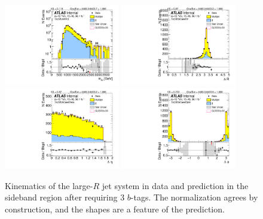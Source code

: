 \begin{figure}[htbp!]
\begin{center}
\includegraphics[angle=270, width=0.45\textwidth]{./figures/boosted/Sideband/b77_ThreeTag_Sideband_mHH_l_1.pdf}
\includegraphics[angle=270, width=0.45\textwidth]{./figures/boosted/Sideband/b77_ThreeTag_Sideband_hCandDr.pdf}\\
\includegraphics[angle=270, width=0.45\textwidth]{./figures/boosted/Sideband/b77_ThreeTag_Sideband_hCandDeta.pdf}
\includegraphics[angle=270, width=0.45\textwidth]{./figures/boosted/Sideband/b77_ThreeTag_Sideband_hCandDphi.pdf}
  \caption{Kinematics of the large-$R$ jet system in data and prediction in the sideband region after requiring 3 $b$-tags. The normalization agrees by construction, and the shapes are a feature of the prediction. }
  \label{fig:boosted-3b-sideband-ak10-system}
\end{center}
\end{figure}

